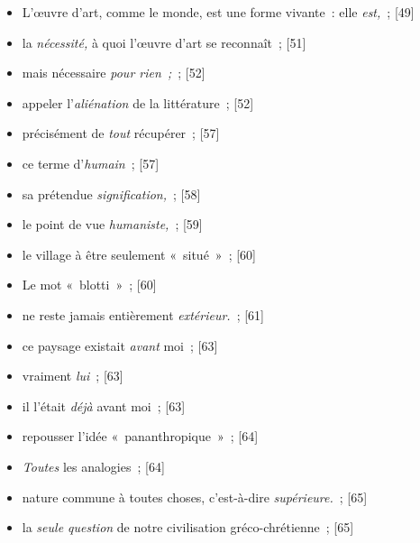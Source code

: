 \documentclass[12pt, a4paper]{article}
\begin{document}
\begin{itemize}
    \item L’œuvre d’art, comme le monde, est une forme vivante~: elle \textit{est,}{\color{gray}~; [49]}

    \item la \textit{nécessité,} à quoi l’œuvre d’art se reconnaît{\color{gray}~; [51]}

    \item mais nécessaire \textit{pour rien~;}{\color{gray}~; [52]}

    \item appeler l’\textit{aliénation} de la littérature{\color{gray}~; [52]}

    \item précisément de \textit{tout} récupérer{\color{gray}~; [57]}

    \item ce terme d’\textit{humain}{\color{gray}~; [57]}

    \item sa prétendue \textit{signification,}{\color{gray}~; [58]}

    \item le point de vue \textit{humaniste,}{\color{gray}~; [59]}

    \item le village à être seulement «~situé~»{\color{gray}~; [60]}

    \item Le mot «~blotti~»{\color{gray}~; [60]}

    \item ne reste jamais entièrement \textit{extérieur.}{\color{gray}~; [61]}

    \item ce paysage existait \textit{avant }moi{\color{gray}~; [63]}

    \item vraiment \textit{lui}{\color{gray}~; [63]}

    \item il l’était \textit{déjà }avant moi{\color{gray}~; [63]}

    \item  repousser l’idée «~pananthropique~»{\color{gray}~; [64]}

    \item \textit{Toutes} les analogies{\color{gray}~; [64]}

    \item nature commune à toutes choses, c’est-à-dire \textit{supérieure.}{\color{gray}~; [65]}

    \item la \textit{seule question }de notre civilisation gréco-chrétienne{\color{gray}~; [65]}


\end{itemize}
\end{document}
